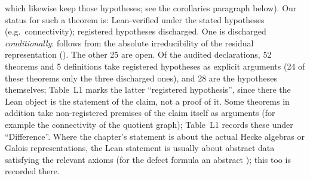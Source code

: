 \begin{sloppypar}
which likewise keep those hypotheses; see the corollaries paragraph below). Our status for such a theorem is: Lean-verified under the stated hypotheses
(e.g.\ connectivity); registered hypotheses discharged. One is discharged \emph{conditionally}:  follows from the
absolute irreducibility of the residual representation (). The other 25 are
open. Of the \NumAuditedRows{} audited declarations, 52 theorems and 5 definitions take registered hypotheses as explicit arguments
(24 of these theorems only the three discharged ones), and 28 are the hypotheses themselves; Table~L1 marks the latter
``registered hypothesis'', since there the Lean object is the statement of the claim, not a proof of it. Some theorems
in addition take non-registered premises of the claim itself as arguments (for example the connectivity
 of the quotient graph); Table~L1 records these under ``Difference''. Where the chapter's
statement is about the actual Hecke algebras or Galois representations, the Lean statement is usually about abstract
data satisfying the relevant axioms (for the defect formula an abstract ); this too is recorded
there.
\end{sloppypar}

